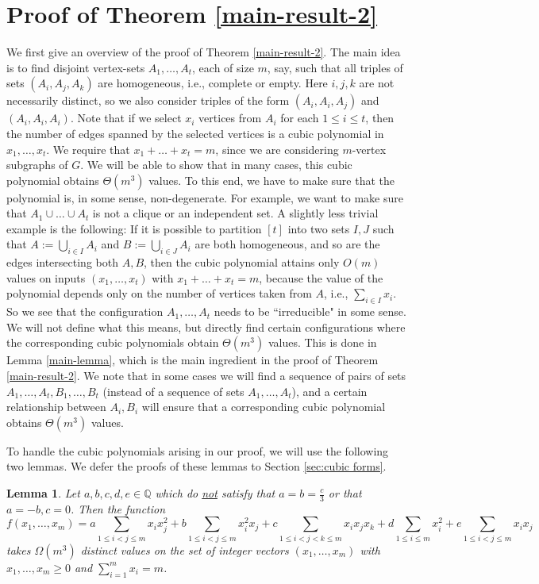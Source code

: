 \documentclass[11pt]{article}
\theoremstyle{plain}
\newtheorem{lemma}[theorem]{Lemma}
\begin{document}
\section{Proof of Theorem \ref{main-result-2}}\label{sec:subgraph-densities}

We first give an overview of the proof of Theorem \ref{main-result-2}.
The main idea is to find disjoint vertex-sets $A_1,\dots,A_t$, each of size $m$, say, such that all triples of sets $(A_i,A_j,A_k)$ are homogeneous, i.e., complete or empty. Here $i,j,k$ are not necessarily distinct, so we also consider triples of the form $(A_i,A_i,A_j)$ and $(A_i,A_i,A_i)$. Note that if we select $x_i$ vertices from $A_i$ for each $1 \leq i \leq t$, then the number of edges spanned by the selected vertices is a cubic polynomial in $x_1,\dots,x_t$. We require that $x_1 + \dots + x_t = m$, since we are considering $m$-vertex subgraphs of $G$. We will be able to show that in many cases, this cubic polynomial obtains $\Theta(m^3)$ values. To this end, we have to make sure that the polynomial is, in some sense, non-degenerate. For example, we want to make sure that $A_1 \cup \dots \cup A_t$ is not a clique or an independent set. A slightly less trivial example is the following: If it is possible to partition $[t]$ into two sets $I,J$ such that $A := \bigcup_{i \in I}A_i$ and $B := \bigcup_{i \in J}A_i$ are both homogeneous, and so are the edges intersecting both $A,B$, then the cubic polynomial attains only $O(m)$ values on inputs $(x_1,\dots,x_t)$ with $x_1 + \dots + x_t = m$, because the value of the polynomial depends only on the number of vertices taken from $A$, i.e., $\sum_{i \in I}x_i$. So we see that the configuration $A_1,\dots,A_t$ needs to be ``irreducible" in some sense. 
We will not define what this means, but directly find certain configurations where the corresponding cubic polynomials obtain $\Theta(m^3)$ values.  
This is done in Lemma \ref{main-lemma}, which is the main ingredient in the proof of Theorem \ref{main-result-2}. 
We note that in some cases we will find a sequence of pairs of sets $A_1,\dots,A_t,B_1,\dots,B_t$
(instead of a sequence of sets $A_1,\dots,A_t$), and a certain relationship between $A_i,B_i$ will ensure that a corresponding cubic polynomial obtains $\Theta(m^3)$ values. 

To handle the cubic polynomials arising in our proof, we will use the following two lemmas. We defer the proofs of these lemmas to Section \ref{sec:cubic forms}. 

\begin{lemma} \label{corollary-1}
    Let $a,b,c,d,e \in \mathbb{Q}$ which do \underline{not} satisfy that $a=b =\frac{c}{3}$ or that $a=-b,c=0$. 
    Then the function 
    $$
	f(x_1,\dots,x_m) = a \sum_{1 \leq i < j \leq m} x_ix_j^2 + 
    b \sum_{1 \leq i < j \leq m} x_i^2x_j + c \sum_{1 \leq i < j < k \leq m} x_i x_j x_k + d \sum_{1 \leq i \leq m} x_i^2 + e \sum_{1 \leq i < j \leq m} x_i x_j
	$$
    takes $\Omega(m^3)$ distinct values on the set of integer vectors 
    $(x_1,\dots,x_m)$ with $x_1,\dots,x_m \geq 0$ and $\sum_{i=1}^mx_i = m$.
\end{lemma}
\end{document}
